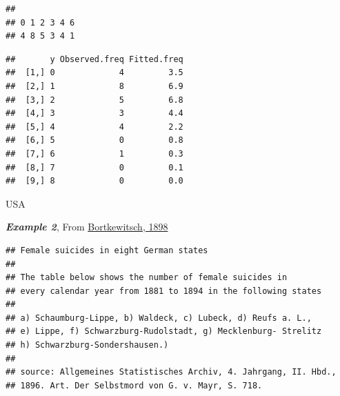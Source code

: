 \documentclass[]{book}
\newenvironment{Shaded}{\begin{snugshade}}{\end{snugshade}}
\newcommand{\CommentTok}[1]{\textcolor[rgb]{0.56,0.35,0.01}{\textit{#1}}}
\newcommand{\DecValTok}[1]{\textcolor[rgb]{0.00,0.00,0.81}{#1}}
\newcommand{\KeywordTok}[1]{\textcolor[rgb]{0.13,0.29,0.53}{\textbf{#1}}}
\newcommand{\NormalTok}[1]{#1}
\newcommand{\OperatorTok}[1]{\textcolor[rgb]{0.81,0.36,0.00}{\textbf{#1}}}
\newcommand{\StringTok}[1]{\textcolor[rgb]{0.31,0.60,0.02}{#1}}
\begin{document}
\begin{verbatim}
## 
## 0 1 2 3 4 6 
## 4 8 5 3 4 1
\end{verbatim}

\begin{Shaded}
\end{Shaded}

\begin{verbatim}
##       y Observed.freq Fitted.freq
##  [1,] 0             4         3.5
##  [2,] 1             8         6.9
##  [3,] 2             5         6.8
##  [4,] 3             3         4.4
##  [5,] 4             4         2.2
##  [6,] 5             0         0.8
##  [7,] 6             1         0.3
##  [8,] 7             0         0.1
##  [9,] 8             0         0.0
\end{verbatim}

USA

\textbf{\emph{Example 2}}, From \href{http://www.biostat.mcgill.ca/hanley/statbook/dasGesetzDerKeinemZaklenBortkiewicz.pdf\#page=51}{Bortkewitsch, 1898}

\begin{verbatim}
## Female suicides in eight German states
## 
## The table below shows the number of female suicides in
## every calendar year from 1881 to 1894 in the following states
## 
## a) Schaumburg-Lippe, b) Waldeck, c) Lubeck, d) Reufs a. L., 
## e) Lippe, f) Schwarzburg-Rudolstadt, g) Mecklenburg- Strelitz
## h) Schwarzburg-Sondershausen.)
## 
## source: Allgemeines Statistisches Archiv, 4. Jahrgang, II. Hbd.,
## 1896. Art. Der Selbstmord von G. v. Mayr, S. 718.
\end{verbatim}
\end{document}

